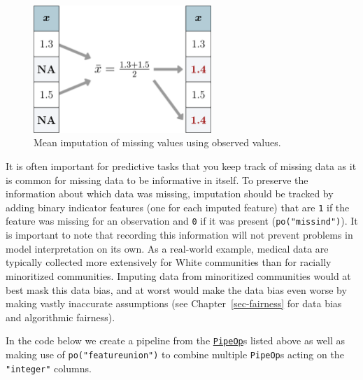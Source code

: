 \begin{figure}

{\centering \includegraphics[width=0.6\textwidth,height=\textheight]{chapters/chapter9/Figures/mlr3book_figures-13.png}

}

\caption{\label{fig-imputation}Mean imputation of missing values using
observed values.}

\end{figure}

It is often important for predictive tasks that you keep track of
missing data as it is common for missing data to be informative in
itself. To preserve the information about which data was missing,
imputation should be tracked by adding binary indicator features (one
for each imputed feature) that are \texttt{1} if the feature was missing
for an observation and \texttt{0} if it was present
(\texttt{po("missind")}). It is important to note that recording this
information will not prevent problems in model interpretation on its
own. As a real-world example, medical data are typically collected more
extensively for White communities than for racially minoritized
communities. Imputing data from minoritized communities would at best
mask this data bias, and at worst would make the data bias even worse by
making vastly inaccurate assumptions (see Chapter~\ref{sec-fairness} for
data bias and algorithmic fairness).

In the code below we create a pipeline from the
\href{https://mlr3pipelines.mlr-org.com/reference/PipeOp.html}{\texttt{PipeOp}}s
listed above as well as making use of \texttt{po("featureunion")} to
combine multiple \texttt{PipeOp}s acting on the \texttt{"integer"}
columns.


